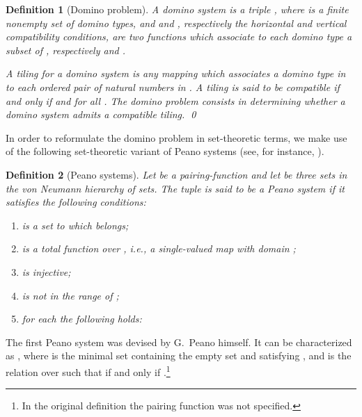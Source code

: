 \documentclass[submission,copyright,creativecommons]{eptcs}
\newtheorem{definition}{Definition}
\newcommand{\corr}[1]{#1}
\begin{document}
\begin{definition}[Domino problem]\label{DOMINO}
A \emph{domino system} is a triple , where
 is a finite nonempty set of \emph{domino
types}, and  and , respectively the \emph{horizontal} and
\emph{vertical compatibility conditions}, are two functions
which associate to each domino type  a subset of ,
respectively  and .

A \emph{tiling}  for a domino system 
is any mapping which associates a domino type in  to each 
ordered pair of natural numbers in .
A tiling  is said to be \emph{compatible} 
if and only if   and 
 for all .
The \emph{domino problem} consists in 
determining whether a domino system admits a compatible tiling.
\qed
\end{definition}

In order to reformulate the domino problem in set-theoretic terms, we
make use of the following set-theoretic variant of Peano systems (see, 
for instance, \cite{Mos2005}).


\begin{definition}[Peano systems]\label{PEANO}
Let  be a pairing-function and let  be
three sets in the von Neumann hierarchy of sets.  The tuple
 is said to be a Peano system
if it satisfies the following conditions:

\begin{enumerate}[label=\textbf{(P\arabic*)}]
 \item\label{P1}  is a set to which  belongs;

 \item\label{P2}  is a
 total function over , i.e., a single-valued map with domain
 ;


 \item\label{P3}  is injective;
 
 \item\label{P4}  is not in the range of ;
 
 \item\label{P5} for each  the following holds:

\end{enumerate}
\end{definition}
\noindent The first Peano system was devised by G.\ Peano himself.  It
can be \corr{characterized} as , where  is the minimal set
containing the empty set  and satisfying , and  is the relation
over  such that  if and only if .\footnote{In the original
definition the pairing function was not specified.}
\end{document}
